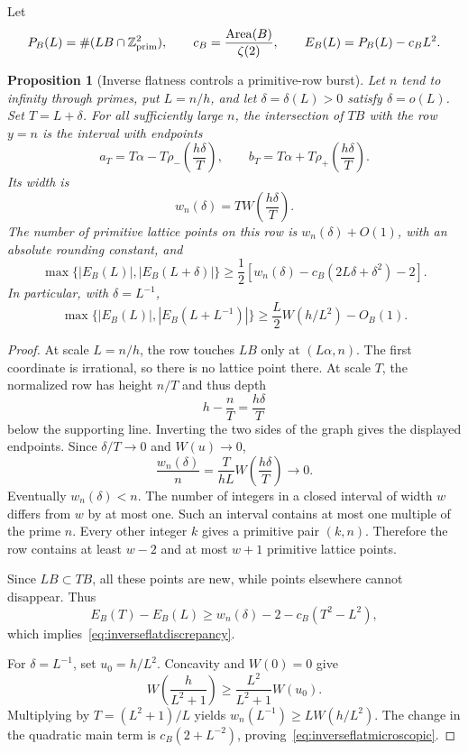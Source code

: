 \documentclass[11pt,a4paper]{article}
\numberwithin{equation}{section}
\newtheorem{proposition}[theorem]{Proposition}
\theoremstyle{definition}
\theoremstyle{remark}
\newcommand{\ZZ}{\mathbb Z}
\begin{document}
Let
\[
 P_B(L)=\#(LB\cap\ZZ^2_{\rm prim}),\qquad
 c_B=\frac{\operatorname{Area}(B)}{\zeta(2)},\qquad
 E_B(L)=P_B(L)-c_BL^2.
\]

\begin{proposition}[Inverse flatness controls a primitive-row burst]
\label{prop:inverseflatrow}
Let $n$ tend to infinity through primes, put $L=n/h$, and let
$\delta=\delta(L)>0$ satisfy $\delta=o(L)$. Set $T=L+\delta$.
For all sufficiently large $n$, the intersection of $TB$ with the row
$y=n$ is the interval with endpoints
\[
 a_T=T\alpha-T\rho_-\!\left(\frac{h\delta}{T}\right),\qquad
 b_T=T\alpha+T\rho_+\!\left(\frac{h\delta}{T}\right).
\]
Its width is
\begin{equation}
 w_n(\delta)=T W\!\left(\frac{h\delta}{T}\right).
 \label{eq:inverseflatwidth}
\end{equation}
The number of primitive lattice points on this row is $w_n(\delta)+O(1)$,
with an absolute rounding constant, and
\begin{equation}
 \max\{|E_B(L)|,|E_B(L+\delta)|\}
 \geq\frac12\left[
 w_n(\delta)-c_B(2L\delta+\delta^2)-2\right].
 \label{eq:inverseflatdiscrepancy}
\end{equation}
In particular, with $\delta=L^{-1}$,
\begin{equation}
 \max\{|E_B(L)|,|E_B(L+L^{-1})|\}
 \geq\frac L2W(h/L^2)-O_B(1).
 \label{eq:inverseflatmicroscopic}
\end{equation}
\end{proposition}

\begin{proof}
At scale $L=n/h$, the row touches $LB$ only at $(L\alpha,n)$.
The first coordinate is irrational, so there is no lattice point there.
At scale $T$, the normalized row has height $n/T$ and thus depth
\[
 h-\frac nT=\frac{h\delta}{T}
\]
below the supporting line. Inverting the two sides of the graph gives
the displayed endpoints. Since $\delta/T\to0$ and $W(u)\to0$,
\[
 \frac{w_n(\delta)}n=\frac{T}{hL}
 W\!\left(\frac{h\delta}{T}\right)\longrightarrow0.
\]
Eventually $w_n(\delta)<n$. The number of integers in a closed interval
of width $w$ differs from $w$ by at most one. Such an interval contains
at most one multiple of the prime $n$. Every other integer $k$ gives a
primitive pair $(k,n)$. Therefore the row contains at least $w-2$ and
at most $w+1$ primitive lattice points.

Since $LB\subset TB$, all these points are new, while points elsewhere
cannot disappear. Thus
\[
 E_B(T)-E_B(L)
 \geq w_n(\delta)-2-c_B(T^2-L^2),
\]
which implies~\eqref{eq:inverseflatdiscrepancy}.

For $\delta=L^{-1}$, set $u_0=h/L^2$. Concavity and $W(0)=0$ give
\[
 W\!\left(\frac h{L^2+1}\right)
 \geq\frac{L^2}{L^2+1}W(u_0).
\]
Multiplying by $T=(L^2+1)/L$ yields
$w_n(L^{-1})\geq LW(h/L^2)$. The change in the quadratic main term
is $c_B(2+L^{-2})$, proving~\eqref{eq:inverseflatmicroscopic}.
\end{proof}
\end{document}
